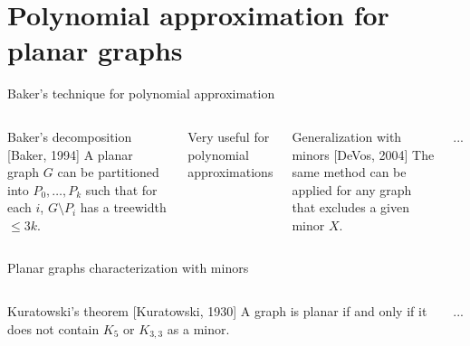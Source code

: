 \documentclass[aspectratio=169]{beamer}
\begin{document}
{\section{Polynomial approximation for planar graphs}}

\begin{frame}{Baker's technique for polynomial approximation}
    \begin{columns}
        \begin{block}{Baker's decomposition [Baker, 1994]}
            A \alert{planar graph} $G$ can be partitioned into $P_0, \dots, P_k$ such that for each $i$, $G \setminus P_i$ has a \alert{treewidth} $\leqslant 3k$.
        \end{block}

        Very useful for \alert{polynomial approximations}

        \begin{block}{Generalization with minors [DeVos, 2004]}
            The same method can be applied for any graph that \alert{excludes a given minor} $X$.
        \end{block}

        ...
    \end{columns}
\end{frame}

\begin{frame}{Planar graphs characterization with minors}
    \begin{columns}

        \begin{block}{Kuratowski's theorem [Kuratowski, 1930]}
            A graph is planar if and only if it does not contain \alert{$K_5$} or \alert{$K_{3,3}$} as a minor.
        \end{block}

        ...
    \end{columns}
\end{frame}
\end{document}
